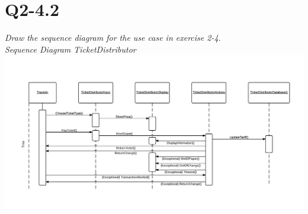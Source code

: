 \section{Q2-4.2}
\emph{Draw the sequence diagram for the use case in exercise 2-4.}
\\
\emph{Sequence Diagram TicketDistributor}
\\
\includegraphics[scale=0.22]{Sequence-Diagram-TicketDistributor}